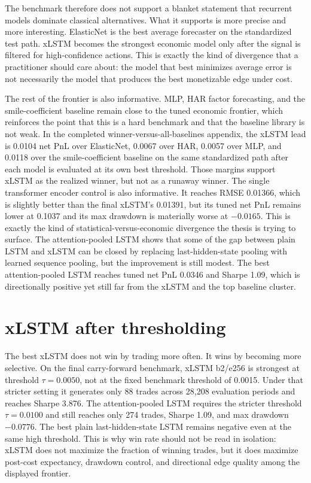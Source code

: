 \documentclass[12pt]{report}
\begin{document}
The benchmark therefore does not support a blanket statement that recurrent models dominate classical alternatives. What it supports is more precise and more interesting. ElasticNet is the best average forecaster on the standardized test path. xLSTM becomes the strongest economic model only after the signal is filtered for high-confidence actions. This is exactly the kind of divergence that a practitioner should care about: the model that best minimizes average error is not necessarily the model that produces the best monetizable edge under cost.

The rest of the frontier is also informative. MLP, HAR factor forecasting, and the smile-coefficient baseline remain close to the tuned economic frontier, which reinforces the point that this is a hard benchmark and that the baseline library is not weak. In the completed winner-versus-all-baselines appendix, the xLSTM lead is 0.0104 net PnL over ElasticNet, 0.0067 over HAR, 0.0057 over MLP, and 0.0118 over the smile-coefficient baseline on the same standardized path after each model is evaluated at its own best threshold. Those margins support xLSTM as the realized winner, but not as a runaway winner. The single transformer encoder control is also informative. It reaches RMSE 0.01366, which is slightly better than the final xLSTM's 0.01391, but its tuned net PnL remains lower at 0.1037 and its max drawdown is materially worse at \(-0.0165\). This is exactly the kind of statistical-versus-economic divergence the thesis is trying to surface. The attention-pooled LSTM shows that some of the gap between plain LSTM and xLSTM can be closed by replacing last-hidden-state pooling with learned sequence pooling, but the improvement is still modest. The best attention-pooled LSTM reaches tuned net PnL 0.0346 and Sharpe 1.09, which is directionally positive yet still far from the xLSTM and the top baseline cluster.

\section{xLSTM after thresholding}
The best xLSTM does not win by trading more often. It wins by becoming more selective. On the final carry-forward benchmark, xLSTM b2/e256 is strongest at threshold \(\tau=0.0050\), not at the fixed benchmark threshold of 0.0015. Under that stricter setting it generates only 88 trades across 28,208 evaluation periods and reaches Sharpe 3.876. The attention-pooled LSTM requires the stricter threshold \(\tau=0.0100\) and still reaches only 274 trades, Sharpe 1.09, and max drawdown \(-0.0776\). The best plain last-hidden-state LSTM remains negative even at the same high threshold. This is why win rate should not be read in isolation: xLSTM does not maximize the fraction of winning trades, but it does maximize post-cost expectancy, drawdown control, and directional edge quality among the displayed frontier.
\end{document}
